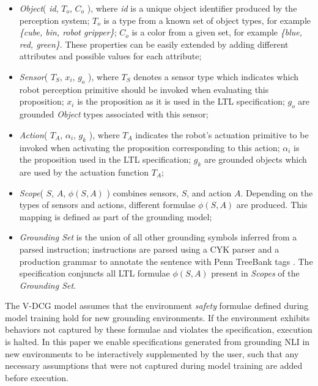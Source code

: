 \documentclass[letterpaper]{article} %
\begin{document}
\begin{itemize}[nolistsep,noitemsep]
\item \textit{Object}( \textit{id}, $T_o$, $C_o$ ), where \textit{id} is a unique object identifier produced by the perception system; $T_o$ is a type from a known set of object types, for example \textit{\{cube, bin, robot gripper\}}; $C_o$ is a color from a given set, for example \textit{\{blue, red, green\}}. These properties can be easily extended by adding different attributes and possible values for each attribute;

\item \textit{Sensor}( $T_S$, $x_i$, $g_o$ ), where $T_S$ denotes a sensor type which indicates which robot perception primitive should be invoked when evaluating this proposition; $x_i$ is the proposition as it is used in the LTL specification; $g_o$ are grounded \textit{Object} types associated with this sensor;

\item \textit{Action}( $T_A$, $\alpha_i$, $g_k$ ), where $T_A$ indicates the robot's actuation primitive to be invoked when activating the proposition corresponding to this action; $\alpha_i$ is the proposition used in the LTL specification; $g_k$ are grounded objects which are used by the actuation function $T_A$;

\item \textit{Scope}( $S$, $A$, $\phi(S,A)$ ) combines sensors, $S$, and action $A$. Depending on the types of sensors and actions, different formulae $\phi(S,A)$ are produced. This mapping is defined as part of the grounding model;

\item \textit{Grounding Set} is the union of all other grounding symbols inferred from a parsed instruction; instructions are parsed using a CYK parser \cite{gonzalez1978syntactic} and a production grammar to annotate the sentence with Penn TreeBank tags \cite{marcus1994penn}. The specification conjuncts all LTL formulae $\phi(S,A)$ present in \textit{Scopes} of the \textit{Grounding Set}.

\end{itemize}

The V-DCG model assumes that the environment \textit{safety} formulae defined during model training hold for new grounding environments. If the environment exhibits behaviors not captured by these formulae and violates the specification, execution is halted. %
In this paper we enable specifications generated from grounding NLI in new environments to be interactively supplemented by the user, such that any necessary assumptions that were not captured during model training are added before execution.
\end{document}
